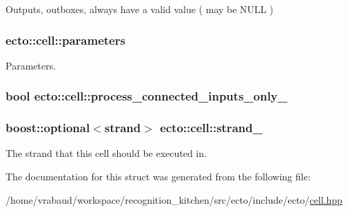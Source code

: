 Outputs, outboxes, always have a valid value ( may be N\-U\-L\-L ) 

\hypertarget{structecto_1_1cell_ae00a91199c758cf7c24dcf0ecdf70a27}{
\subsubsection[{parameters}]{ ecto\-::cell\-::parameters}}\label{structecto_1_1cell_ae00a91199c758cf7c24dcf0ecdf70a27}


Parameters. 

\hypertarget{structecto_1_1cell_a9a9d7fa3bb72fd74073a997bfb6cbad8}{
\subsubsection[{process\-\_\-connected\-\_\-inputs\-\_\-only\-\_\-}]{\setlength{\rightskip}{0pt plus 5cm}bool ecto\-::cell\-::process\-\_\-connected\-\_\-inputs\-\_\-only\-\_\-\hspace{0.3cm}{\ttfamily [private]}}}\label{structecto_1_1cell_a9a9d7fa3bb72fd74073a997bfb6cbad8}
\hypertarget{structecto_1_1cell_ada052f06257277c1b53c82226dff5821}{
\subsubsection[{strand\-\_\-}]{\setlength{\rightskip}{0pt plus 5cm}boost\-::optional$<${\bf strand}$>$ ecto\-::cell\-::strand\-\_\-}}\label{structecto_1_1cell_ada052f06257277c1b53c82226dff5821}


The strand that this cell should be executed in. 



The documentation for this struct was generated from the following file\-:\begin{DoxyCompactItemize}
\item 
/home/vrabaud/workspace/recognition\-\_\-kitchen/src/ecto/include/ecto/\hyperlink{cell_8hpp}{cell.\-hpp}\end{DoxyCompactItemize}
